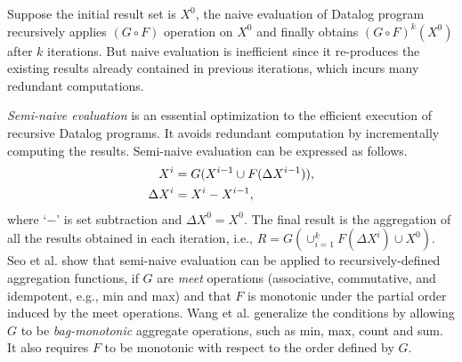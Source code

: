 Suppose the initial result set is $X^0$, the naive evaluation of Datalog program recursively applies $(G\circ F)$ operation on $X^0$ and finally obtains $(G\circ F)^k(X^0)$ after $k$ iterations. But naive evaluation is inefficient since it re-produces the existing results already contained in previous iterations, which incurs many redundant computations.

\textit{Semi-naive evaluation} is an essential optimization to the efficient execution of recursive Datalog programs. It avoids redundant computation by incrementally computing the results. Semi-naive evaluation can be expressed as follows.
\begin{equation}
\label{eq:seminaive}
\begin{aligned}
X^{i}&=G(X^{i-1} \cup F(\Delta X^{i-1})),\notag\\
  \Delta X^i&=X^i-X^{i-1}, 
\end{aligned}
\end{equation}
where `$-$' is set subtraction and $\Delta X^0=X^0$. The final result is the aggregation of all the results obtained in each iteration, i.e., $R=G(\cup_{i=1}^{k}F(\Delta X^i)\cup X^0)$. Seo et al. \cite{Lam:2013:SDE:2510649.2511289} show that semi-naive evaluation can be applied to recursively-defined aggregation functions, if $G$ are \textit{meet} operations (associative, commutative, and idempotent, e.g., min and max) and that $F$ is monotonic under the partial order induced by the meet operations. Wang et al. \cite{Wang:2015:AFR:2824032.2824052} generalize the conditions by allowing $G$ to be \textit{bag-monotonic} aggregate operations, such as min, max, count and sum. It also requires $F$ to be monotonic with respect to the order defined by $G$.








